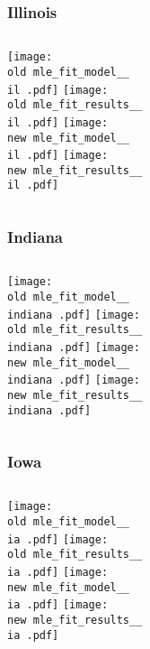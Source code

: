 \documentclass{beamer}
\newcommand{\old}{api-370-prod/pyseir/state_summaries/reports/}
\newcommand{\new}{new/pyseir/state_summaries/reports/}
\newcommand{\il}{Illinois__17}
\newcommand{\indiana}{Indiana__18}
\newcommand{\ia}{Iowa__19}
\begin{document}
\begin{frame}
\frametitle{Illinois}
    \begin{columns}[t]

       \texttt{[image: \\old mle\_fit\_model\_\_\\il .pdf]}
       \texttt{[image: \\old mle\_fit\_results\_\_\\il .pdf]}   
       \texttt{[image: \\new mle\_fit\_model\_\_\\il .pdf]}
       \texttt{[image: \\new mle\_fit\_results\_\_\\il .pdf]}   
       
\end{columns}
\end{frame}



\begin{frame}
\frametitle{Indiana}
    \begin{columns}[t]

       \texttt{[image: \\old mle\_fit\_model\_\_\\indiana .pdf]}
       \texttt{[image: \\old mle\_fit\_results\_\_\\indiana .pdf]}   
       \texttt{[image: \\new mle\_fit\_model\_\_\\indiana .pdf]}
       \texttt{[image: \\new mle\_fit\_results\_\_\\indiana .pdf]}   
\end{columns}
\end{frame}


\begin{frame}
\frametitle{Iowa}
    \begin{columns}[t]

       \texttt{[image: \\old mle\_fit\_model\_\_\\ia .pdf]}
       \texttt{[image: \\old mle\_fit\_results\_\_\\ia .pdf]}   
       \texttt{[image: \\new mle\_fit\_model\_\_\\ia .pdf]}
       \texttt{[image: \\new mle\_fit\_results\_\_\\ia .pdf]}   
\end{columns}
\end{frame}
\end{document}
